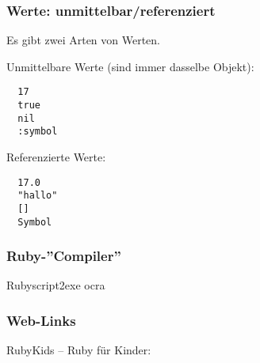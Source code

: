 \documentclass{beamer}
\begin{document}
\lstset{language=Ruby}
\lstset{basicstyle=\small,numbers=none, numberstyle=\tiny, numbersep=5pt}
  
  
  
\begin{frame}[fragile]
  \frametitle{Werte: unmittelbar/referenziert}
  
  \pause
  Es gibt zwei Arten von Werten.
  
  Unmittelbare Werte (sind immer dasselbe Objekt):
  \begin{lstlisting}
  17
  true
  nil
  :symbol
  \end{lstlisting}
  \pause
  Referenzierte Werte:
  \begin{lstlisting}
  17.0
  "hallo"
  []
  Symbol
  \end{lstlisting}
\end{frame} 

\begin{frame}
  \frametitle{Ruby-''Compiler''}
  Rubyscript2exe
  ocra
\end{frame} 

\begin{frame}
  \frametitle{Web-Links}
  RubyKids -- Ruby für Kinder: 
\end{frame} 
\end{document}
